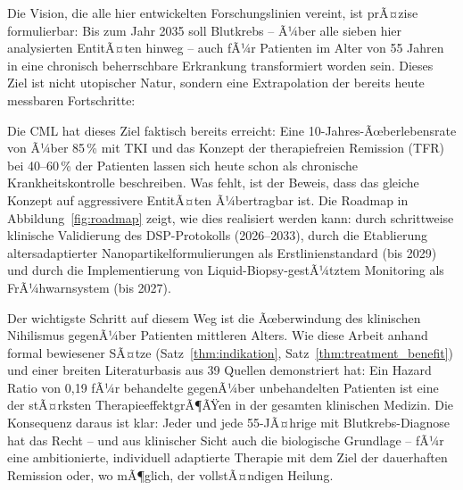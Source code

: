 ﻿\documentclass[12pt,a4paper]{article}
\theoremstyle{definition}
\begin{document}
Die Vision, die alle hier entwickelten Forschungslinien vereint, ist prÃ¤zise formulierbar:
Bis zum Jahr 2035 soll Blutkrebs -- Ã¼ber alle sieben hier analysierten EntitÃ¤ten hinweg
-- auch fÃ¼r Patienten im Alter von 55 Jahren in eine chronisch beherrschbare Erkrankung
transformiert worden sein. Dieses Ziel ist nicht utopischer Natur, sondern eine
Extrapolation der bereits heute messbaren Fortschritte:

Die CML hat dieses Ziel faktisch bereits erreicht: Eine 10-Jahres-Ãœberlebensrate
von Ã¼ber 85\,\% mit TKI und das Konzept der therapiefreien Remission (TFR) bei 40--60\,\%
der Patienten lassen sich heute schon als chronische Krankheitskontrolle beschreiben.
Was fehlt, ist der Beweis, dass das gleiche Konzept auf aggressivere EntitÃ¤ten Ã¼bertragbar
ist. Die Roadmap in Abbildung~\ref{fig:roadmap} zeigt, wie dies realisiert werden kann:
durch schrittweise klinische Validierung des DSP-Protokolls (2026--2033), durch die
Etablierung altersadaptierter Nanopartikelformulierungen als Erstlinienstandard
(bis 2029) und durch die Implementierung von Liquid-Biopsy-gestÃ¼tztem Monitoring
als FrÃ¼hwarnsystem (bis 2027).

Der wichtigste Schritt auf diesem Weg ist die Ãœberwindung des klinischen Nihilismus
gegenÃ¼ber Patienten mittleren Alters. Wie diese Arbeit anhand formal bewiesener
SÃ¤tze (Satz~\ref{thm:indikation}, Satz~\ref{thm:treatment_benefit}) und einer breiten
Literaturbasis aus 39 Quellen demonstriert hat: Ein Hazard Ratio von 0,19 fÃ¼r
behandelte gegenÃ¼ber unbehandelten Patienten ist eine der stÃ¤rksten TherapieeffektgrÃ¶ÃŸen
in der gesamten klinischen Medizin. Die Konsequenz daraus ist klar: Jeder und jede
55-JÃ¤hrige mit Blutkrebs-Diagnose hat das Recht -- und aus klinischer Sicht auch die
biologische Grundlage -- fÃ¼r eine ambitionierte, individuell adaptierte Therapie mit
dem Ziel der dauerhaften Remission oder, wo mÃ¶glich, der vollstÃ¤ndigen Heilung.
\end{document}
